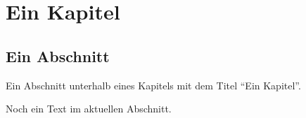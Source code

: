 \documentclass[a6paper,twoside]{report}
\begin{document}
\pagestyle{headings}

\chapter{Ein Kapitel}
\label{sec:ein-abschnitt}

\newpage

\section{Ein Abschnitt}
\label{sec:ein-unterabschnitt}

Ein Abschnitt unterhalb eines Kapitels mit dem Titel "`Ein Kapitel"'.

\newpage

Noch ein Text im aktuellen Abschnitt.
\end{document}
